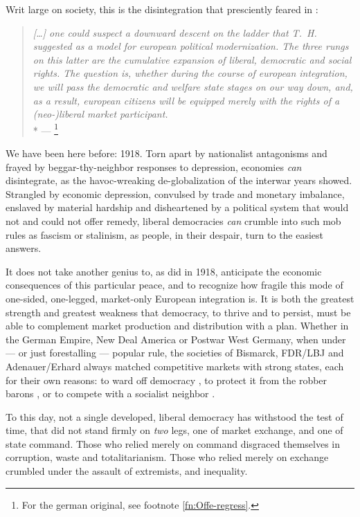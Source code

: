 Writ large on society, this is the disintegration that \citeauthor{Offe1998} presciently feared in \citeyear{Offe1998}:
\begin{quote}
	\emph{[\ldots] one could suspect a downward descent on the ladder that T.~H.~\cite{Marshall-1950-aa} suggested as a model for european political modernization.
The three rungs on this latter are the cumulative expansion of liberal, democratic and social rights.
The question is, whether during the course of european integration, we will pass the democratic and welfare state stages on our way down, and, as a result, european citizens will be equipped merely with the rights of a (neo-)liberal market participant.}\\*
	--- \cite[41]{Offe1998}
	\footnote{
		For the german original, see footnote \ref{fn:Offe-regress}.
	}
\end{quote}

We have been here before:
1918.
Torn apart by nationalist antagonisms and frayed by beggar-thy-neighbor responses to depression, economies \emph{can} disintegrate, as the havoc-wreaking de-globalization of the interwar years showed.
Strangled by economic depression, convulsed by trade and monetary imbalance, enslaved by material hardship and disheartened by a political system that would not and could not offer remedy, liberal democracies \emph{can} crumble into such mob rules as fascism or stalinism, as people, in their despair, turn to the easiest answers.

It does not take another genius to, as \cite{Keynes1936} did in 1918, anticipate the economic consequences of this particular peace, and to recognize how fragile this mode of one-sided, one-legged, market-only European integration is.
It is both the greatest strength and greatest weakness that democracy, to thrive and to persist, must be able to complement market production and distribution with a plan.
Whether in the German Empire, New Deal America or  Postwar West Germany, when under --- or just forestalling --- popular rule, the societies of Bismarck, FDR/LBJ and Adenauer/Erhard always matched competitive markets with strong states, each for their own reasons:
to ward off democracy \citep{Leibfried}, to protect it from the robber barons \citep{Wapshott2011}, or to compete with a socialist neighbor \citep{Judt2006}.

To this day, not a single developed, liberal democracy has withstood the test of time, that did not stand firmly on \emph{two} legs, one of market exchange, and one of state command.
Those who relied merely on command disgraced themselves in corruption, waste and totalitarianism.
Those who relied merely on exchange crumbled under the assault of extremists, and inequality.

